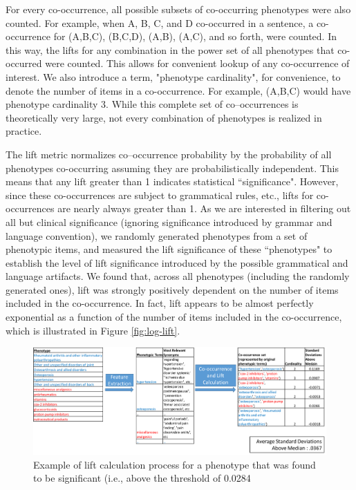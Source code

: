 \documentclass{sig-alternate-05-2015}
\begin{document}
For every co-occurrence, all possible subsets of co-occurring phenotypes were also counted.
For example, when A, B, C, and D co-occurred in a sentence, a co-occurrence for (A,B,C), (B,C,D), (A,B), (A,C), and so forth, were counted.
In this way, the lifts for any combination in the power set of all phenotypes that co-occurred were counted.
This allows for convenient lookup of any co-occurrence of interest.
We also introduce a term, "phenotype cardinality", for convenience, to denote the number of items in a co-occurrence. 
For example, (A,B,C) would have phenotype cardinality 3.
While this complete set of co--occurrences is theoretically very large, not every combination of phenotypes is realized in practice.

The lift metric normalizes co--occurrence probability by the probability of all phenotypes co-occurring assuming they are probabilistically independent.
This means that any lift greater than 1 indicates statistical ``significance".
However, since these co-occurrences are subject to grammatical rules, etc., lifts for co-occurrences are nearly always greater than 1.
As we are interested in filtering out all but clinical significance (ignoring significance introduced by grammar and language convention), we randomly generated phenotypes from a set of phenotypic items, and measured the lift significance of these ``phenotypes" to establish the level of lift significance introduced by the possible grammatical and language artifacts.
We found that, across all phenotypes (including the randomly generated ones), lift was strongly positively dependent on the number of items included in the co-occurrence.
In fact, lift appears to be almost perfectly exponential as a function of the number of items included in the co-occurrence, which is illustrated in Figure \ref{fig:log-lift}.

\begin{figure} [t]
\centering
\includegraphics[width=\linewidth]{lift-process-cartoon.png}
\caption{Example of lift calculation process for a phenotype that was found to be significant (i.e., above the threshold of 0.0284}
\label{fig:lift-process-cartoon}
\end{figure}
\end{document}

